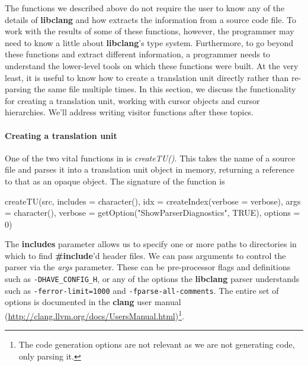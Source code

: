 \documentclass[article]{jss}
\def\R{\proglang{R}}
\def\Rpkg#1{\pkg{#1}}
\def\Rfunc#1{\textsl{#1()}}
\def\Rvar#1{\textsl{#1}}
\def\Rarg#1{\textbf{#1}}
\def\Ckeyword#1{\textbf{#1}}
\def\libclang{\textbf{libclang}}
\def\clang{\textbf{clang}}
\begin{document}
The functions we described above do not require the user to know any
of the details of \libclang{} and how \Rpkg{RCIndex} extracts the
information from a source code file.  To work with the results of some
of these functions, however, the \R{} programmer may need to know a
little about \libclang's type system. Furthermore, to go beyond these
functions and extract different information, a programmer needs to
understand the lower-level tools on which these functions were built.
At the very least, it is useful to know how to create a translation
unit directly rather than re-parsing the same file multiple times.  In
this section, we discuss the functionality for creating a translation
unit, working with cursor objects and cursor hierarchies.  We'll
address writing visitor functions after these topics.



\paragraph{Creating a translation unit} 
One of the two vital functions in \Rpkg{RCIndex} is \Rfunc{createTU}.
This takes the name of a source file and parses it into a translation
unit object in memory, returning a reference to that as an opaque \R{}
object.
The signature of the function is 
\begin{RCode}
createTU(src, includes = character(), 
         idx = createIndex(verbose = verbose), 
         args = character(), 
         verbose = getOption("ShowParserDiagnostics", TRUE), options = 0)   
\end{RCode}
The \Rarg{includes} parameter allows us to specify one or more paths
to directories in which to find \Ckeyword{\#include}'d header files. We
can pass arguments to control the parser via the \Rvar{args}
parameter. These can be pre-processor flags and definitions such as
\verb+-DHAVE_CONFIG_H+, or any of the options the \libclang{} parser
understands such as \verb+-ferror-limit=1000+ and
\verb+-fparse-all-comments+.  The entire set of options is documented in
the \clang{} user manual
(\url{http://clang.llvm.org/docs/UsersManual.html})\footnote{The code
  generation options are not relevant as we are not generating code,
  only parsing it.}.
\end{document}
